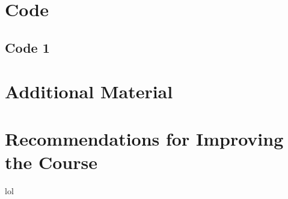 \documentclass[]{book}
\begin{document}
\chapter{Code}
\section{Code 1}

\chapter{Additional Material}


















\begin{landscape}

\end{landscape}
\chapter{Recommendations for Improving the Course}
lol
\end{document}

